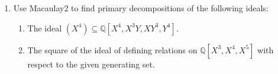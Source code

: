 \documentclass[12pt]{amsart}
\newcommand{\Q}{\mathbb{Q}}
\begin{document}
\begin{enumerate}
\

\item Use Macaulay2 to find primary decompositions of the following ideals:
\begin{enumerate}
\item The ideal $(X^4) \subseteq \Q[X^4,X^3Y, XY^3,Y^4]$.
\item The square of the ideal of defining relations on $\Q[X^3,X^4,X^5]$ with respect to the given generating set.
\end{enumerate}








\end{enumerate}
\end{document}

